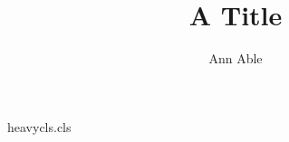 \begin{filecontents*}[force]{heavycls.cls}
\def\corr#1{\gdef\@corr{#1}}\def\@corr{}
\def\work{\count@=0 \loop\advance\count@ by 1 \ifnum\count@<\workn\repeat}
\renewcommand\maketitle{\par\begingroup\centering\work{\Large\@title\par}%
  {\@author\thanks{Corresponding author: \@corr}\par}\@thanks\endgroup}
\end{filecontents*}
\documentclass{heavycls}
\makeatletter{}\makeatother
\title{A Title}
\author{Ann Able}
\maketitle
Text.

